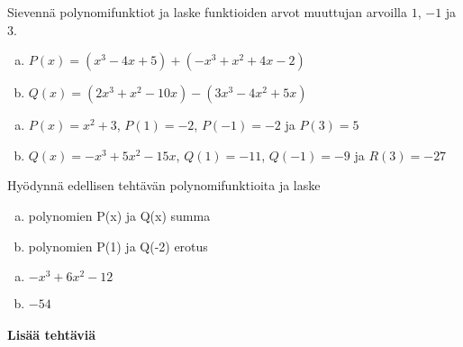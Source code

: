 \begin{tehtavasivu}
\begin{tehtava}
	Sievennä polynomifunktiot ja laske funktioiden arvot muuttujan arvoilla $1$, $-1$ ja $3$.
	\begin{enumerate}[a)]
		\item $P(x)=(x^3-4x+5)+(-x^3+x^2+4x-2)$
		\item $Q(x)=(2x^3+x^2-10x)-(3x^3-4x^2+5x)$
	\end{enumerate}
	
	\begin{vastaus}
		\begin{enumerate}[a)]
			\item $P(x)=x^2+3$, $P(1)=-2$, $P(-1)=-2$ ja $P(3)=5$
			\item $Q(x)=-x^3+5x^2-15x$, $Q(1)=-11$, $Q(-1)=-9$ ja $R(3)=-27$
		\end{enumerate}
	\end{vastaus}
\end{tehtava}

\begin{tehtava}
	Hyödynnä edellisen tehtävän polynomifunktioita ja laske
	\begin{enumerate}[a)]
		 \item polynomien P(x) ja Q(x) summa
		 \item polynomien P(1) ja Q(-2) erotus
	\end{enumerate}
	
	\begin{vastaus}
		\begin{enumerate}[a)]
			\item $-x^3+6x^2-12$
			\item $-54$
	\end{enumerate}
	\end{vastaus}
\end{tehtava}

\paragraph*{Lisää tehtäviä}


\end{tehtavasivu}
